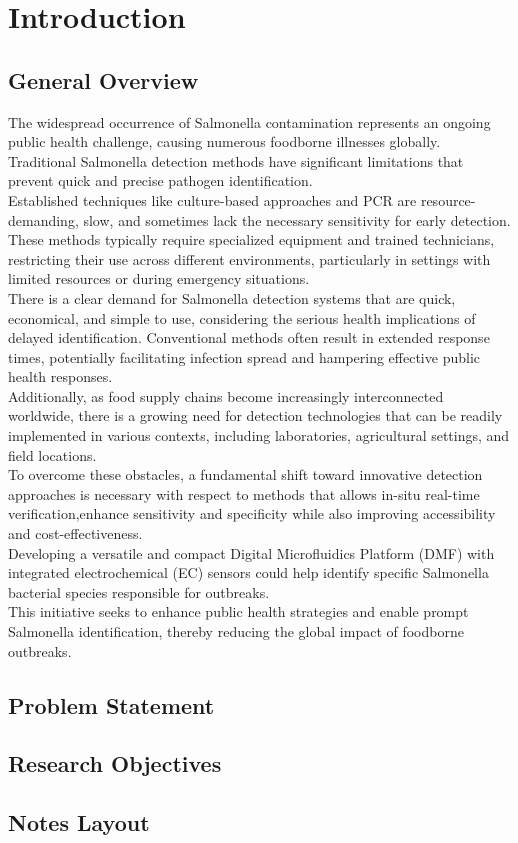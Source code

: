\chapter{Introduction}
\section{General Overview}
The widespread occurrence of Salmonella contamination represents an ongoing public health challenge, causing numerous foodborne illnesses globally. Traditional Salmonella detection methods have significant limitations that prevent quick and precise pathogen identification.\\

Established techniques like culture-based approaches and PCR are resource-demanding, slow, and sometimes lack the necessary sensitivity for early detection. These methods typically require specialized equipment and trained technicians, restricting their use across different environments, particularly in settings with limited resources or during emergency situations.\\

There is a clear demand for Salmonella detection systems that are quick, economical, and simple to use, considering the serious health implications of delayed identification. Conventional methods often result in extended response times, potentially facilitating infection spread and hampering effective public health responses.\\

Additionally, as food supply chains become increasingly interconnected worldwide, there is a growing need for detection technologies that can be readily implemented in various contexts, including laboratories, agricultural settings, and field locations.\\

To overcome these obstacles, a fundamental shift toward innovative detection approaches is necessary with respect to methods that allows in-situ real-time verification,enhance sensitivity and specificity while also improving accessibility and cost-effectiveness.\\

Developing a versatile and compact Digital Microfluidics Platform (DMF) with integrated electrochemical (EC) sensors could help identify specific Salmonella bacterial species responsible for outbreaks.\\

This initiative seeks to enhance public health strategies and enable prompt Salmonella identification, thereby reducing the global impact of foodborne outbreaks.

\section{Problem Statement}
\section{Research Objectives}
\section{Notes Layout}